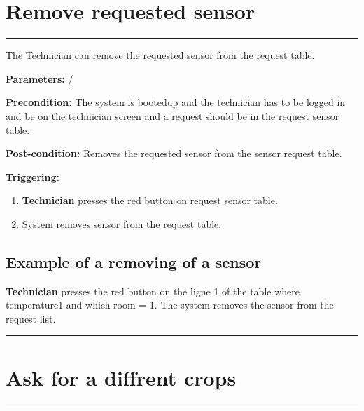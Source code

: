 \section{Remove  requested sensor}

\hrule
\hfill
\vspace{0.5cm}
\label{operation:Request a new sensor}

The Technician can remove the requested sensor from the request table.
\begin{description}
\item \textbf{Parameters:} /
\item \textbf{Precondition:} The system is bootedup and the technician has to be
logged in and be on the technician screen and a request should be in the
request sensor table.
\item \textbf{Post-condition:} Removes the requested sensor from the sensor
request table.

\item \textbf{Triggering:}
\begin{enumerate}
\item \textbf{Technician} presses the red button on request sensor table.
\item System removes sensor from the request table.
\end{enumerate}
\end{description}

\subsection{Example of a removing of a sensor}
\textbf{Technician} presses the red button on the ligne 1 of the table where
temperature1 and which room = 1. The system removes the sensor from the request
list.

\hfill
\vspace{0.5cm}
\hrule



\break



\section{Ask for a diffrent crops}

\hrule
\hfill
\vspace{0.5cm}

\label{operation:Ask for a diffrent crop}

